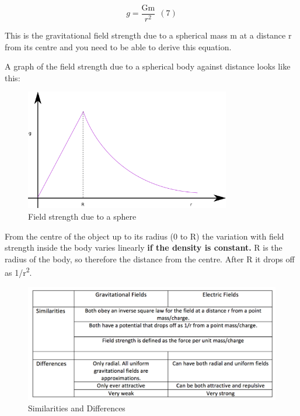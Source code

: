 \documentclass[revision-guide.tex]{subfiles}
\begin{document}
\[g = \frac{\text{Gm}}{r^{2}}\ \ (7)\]

This is the gravitational field strength due to a spherical mass m at a
distance r from its centre and you need to be able to derive this
equation.

A graph of the field strength due to a spherical body against distance
looks like this:

\begin{figure}[h]
  \begin{center}
  \includegraphics[width=0.8\textwidth]{figs/chapt-13/g-r.png}
\end{center}
  \caption{Field strength due to a sphere}
  \label{}
\end{figure}

From the centre of the object up to its radius (0 to R) the variation
with field strength inside the body varies linearly \textbf{if the
density is constant.} R is the radius of the body, so therefore the
distance from the centre. After R it drops off as
1/r\textsuperscript{2}.


\begin{figure}[h]
  \includegraphics[width=\textwidth]{figs/chapt-13/table.png}
  \caption{Similarities and Differences}
  \label{tab:sim}
\end{figure}
\end{document}
